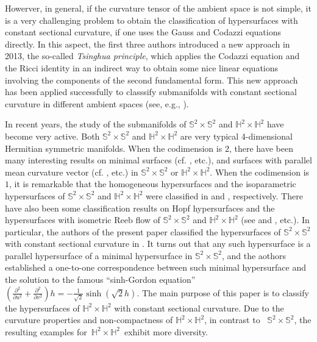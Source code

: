 \documentclass[reqno]{amsart}%
\theoremstyle{definition}
\numberwithin{equation}{section}
\begin{document}
  
Howerver, in general, if the curvature tensor of the ambient space is not simple, it is a very challenging problem to obtain
the classification of hypersurfaces with
constant sectional curvature, if one uses the Gauss and Codazzi
equations directly. In this aspect, the first three authors  introduced a new approach  in 2013,
the so-called {\it Tsinghua principle}, which applies the Codazzi equation
and the Ricci identity in an indirect way to obtain some nice linear equations involving
the components of the second fundamental form.
This new  approach has been  applied successfully to classsify submanifolds with constant sectional curvature in different ambient spaces (see, e.g., \cite{A-L-V-W,LMVVW,LVWY}).


 In recent years, the study of the submanifolds of $\mathbb{S}^2\times\mathbb{S}^2$ and
 $\mathbb{H}^2\times\mathbb{H}^2$ have become very active.
Both  $\mathbb{S}^2\times\mathbb{S}^2$ and
$\mathbb{H}^2\times\mathbb{H}^2$  are very typical 4-dimensional Hermitian symmetric manifolds.
When the codimension is  $2$, there have been many interesting results on minimal surfaces (cf. \cite{C-U,GVWX,LMVVW,T-U2}, etc.), and surfaces with parallel mean curvature vector   (cf. \cite{T-U1}, etc.) in $\mathbb{S}^2\times\mathbb{S}^2$ or
$\mathbb{H}^2\times\mathbb{H}^2$.
 When the codimension is $1$,  it is remarkable that the homogeneous hypersurfaces and the isoparametric hypersurfaces of $\mathbb{S}^2\times\mathbb{S}^2$ and $\mathbb{H}^2\times\mathbb{H}^2$ were classified in  \cite{Ur} and \cite{GMY}, respectively. There have also been some classification results on Hopf hypersurfaces and the hypersurfaces with isometric Reeb flow of  $\mathbb{S}^2\times\mathbb{S}^2$ and $\mathbb{H}^2\times\mathbb{H}^2$ (see \cite{GHMY} and \cite{ZGHY}, etc.).  In particular, the authors of the present paper classified the hypersurfaces of $\mathbb{S}^2\times\mathbb{S}^2$
 with constant sectional curvature in  \cite{LVWY}. It turns out that any such hypersurface is a parallel hypersurface of a minimal hypersurface in $\mathbb{S}^2\times\mathbb{S}^2$, and the aothors established a one-to-one correspondence between such minimal hypersurface and the solution to the famous
 ``sinh-Gordon equation''
 $
 (\frac{\partial^2}{\partial u^2}+\frac{\partial^2}{\partial v^2})h
 =-\tfrac{1}{\sqrt{2}}\sinh(\sqrt{2}h).
 $ 
 The main purpose of this paper is to classify the hypersurfaces of  $\mathbb{H}^2\times\mathbb{H}^2$ with constant sectional curvature. Due to the curvature properties and  non-compactness of $\mathbb{H}^2\times\mathbb{H}^2$, 
in contrast to  $\mathbb{S}^2\times\mathbb{S}^2$, the resulting examples for $\mathbb{H}^2\times\mathbb{H}^2$ exhibit more  diversity. 
\end{document}
